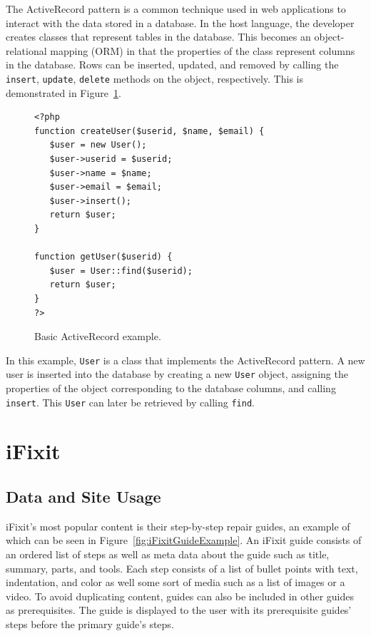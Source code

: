 \documentclass[12pt]{ucthesis}
\begin{document}
The ActiveRecord pattern is a common technique used in web applications to interact with the data stored in a database.
In the host language, the developer creates classes that represent tables in the database.
This becomes an object-relational mapping (ORM) in that the properties of the class represent columns in the database.
Rows can be inserted, updated, and removed by calling the {\tt insert}, {\tt update}, {\tt delete} methods on the object, respectively.
This is demonstrated in Figure~\ref{fig:activeRecordExample}.

\begin{figure}[h]
\begin{ssp}
\begin{verbatim}
<?php
function createUser($userid, $name, $email) {
   $user = new User();
   $user->userid = $userid;
   $user->name = $name;
   $user->email = $email;
   $user->insert();
   return $user;
}

function getUser($userid) {
   $user = User::find($userid);
   return $user;
}
?>
\end{verbatim}
\end{ssp}
\caption{Basic ActiveRecord example.}
\label{fig:activeRecordExample}
\end{figure}

In this example, {\tt User} is a class that implements the ActiveRecord pattern.
A new user is inserted into the database by creating a new {\tt User} object, assigning the properties of the object corresponding to the database columns, and calling {\tt insert}.
This {\tt User} can later be retrieved by calling {\tt find}.


\section{iFixit}

\subsection{Data and Site Usage}
\textsf{iFixit}'s most popular content is their step-by-step repair guides, an example of which can be seen in Figure~\ref{fig:iFixitGuideExample}.
An \textsf{iFixit} guide consists of an ordered list of steps as well as meta data about the guide such as title, summary, parts, and tools.
Each step consists of a list of bullet points with text, indentation, and color as well some sort of media such as a list of images or a video.
To avoid duplicating content, guides can also be included in other guides as prerequisites.
The guide is displayed to the user with its prerequisite guides' steps before the primary guide's steps.
\end{document}
